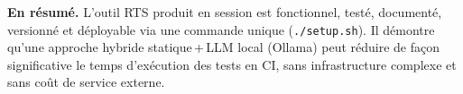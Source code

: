 \documentclass[12pt,a4paper]{article}
\begin{document}
\vspace{1cm}
\begin{tcolorbox}[colback=rtsblue!5, colframe=rtsblue, arc=4pt]
\textbf{En résumé.} L'outil RTS produit en session est fonctionnel, testé,
documenté, versionné et déployable via une commande unique (\texttt{./setup.sh}).
Il démontre qu'une approche hybride statique\,+\,LLM local (Ollama) peut
réduire de façon significative le temps d'exécution des tests en CI, sans
infrastructure complexe et sans coût de service externe.
\end{tcolorbox}
\end{document}

